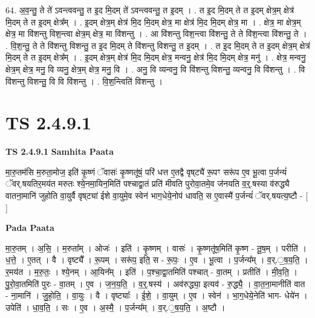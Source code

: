 \documentclass[17pt]{extarticle}
\begin{document}
64. अ॒व॒न्तु॒ ते ते॑ ऽवन्त्ववन्तु॒ त इ॒द मि॒दम् ते॑ ऽवन्त्ववन्तु॒ त इ॒दम् । . त इ॒द मि॒दम् ते त इ॒दम् क्षेत्र॒म् क्षेत्र॑ मि॒दम् ते त इ॒दम् क्षेत्र᳚म् । . इ॒दम् क्षेत्र॒म् क्षेत्र॑ मि॒द मि॒दम् क्षेत्र॒ मा क्षेत्र॑ मि॒द मि॒दम् क्षेत्र॒ मा । . क्षेत्र॒ मा क्षेत्र॒म् क्षेत्र॒ मा वि॑शन्तु विश॒न्त्वा क्षेत्र॒म् क्षेत्र॒ मा वि॑शन्तु । . आ वि॑शन्तु विश॒न्त्वा वि॑शन्तु॒ ते ते वि॑श॒न्त्वा वि॑शन्तु॒ ते । . वि॒श॒न्तु॒ ते ते वि॑शन्तु विशन्तु॒ त इ॒द मि॒दम् ते वि॑शन्तु विशन्तु॒ त इ॒दम् । . त इ॒द मि॒दम् ते त इ॒दम् क्षेत्र॒म् क्षेत्र॑ मि॒दम् ते त इ॒दम् क्षेत्र᳚म् । . इ॒दम् क्षेत्र॒म् क्षेत्र॑ मि॒द मि॒दम् क्षेत्र॒ मन्वनु॒ क्षेत्र॑ मि॒द मि॒दम् क्षेत्र॒ मनु॑ । . क्षेत्र॒ मन्वनु॒ क्षेत्र॒म् क्षेत्र॒ मनु॒ वि व्यनु॒ क्षेत्र॒म् क्षेत्र॒ मनु॒ वि । . अनु॒ वि व्यन्वनु॒ वि वि॑शन्तु विशन्तु॒ व्यन्वनु॒ वि वि॑शन्तु । . वि वि॑शन्तु विशन्तु॒ वि वि वि॑शन्तु । . वि॒श॒न्त्विति॑ विशन्तु । \newline
\pagebreak
{}

\section{ TS 2.4.9.1 }

\textbf{TS 2.4.9.1 } \newline
\textbf{Samhita Paata} \newline

मा॒रु॒तम॑सि म॒रुता॒मोज॒ इति॑ कृ॒ष्णं ॅवासः॑ कृ॒ष्णतू॑षं॒ परि॑ धत्त ए॒तद्वै वृष्‌ट्यै॑ रू॒पꣳ सरू॑प ए॒व भू॒त्वा प॒र्जन्यं॑ ॅवर्.षयतिर॒मय॑त मरुतः श्ये॒नमा॒यिन॒मिति॑ पश्चाद्वा॒तं प्रति॑ मीवति पुरोवा॒तमे॒व ज॑नयति व॒र्॒.षस्या व॑रुद्ध्यै वातना॒मानि॑ जुहोति वा॒युर्वै वृष्‌ट्या॑ ईशे वा॒युमे॒व स्वेन॑ भाग॒धेये॒नोप॑ धावति॒ स ए॒वास्मै॑ प॒र्जन्यं॑ ॅवर्.षयत्य॒ष्टौ - [  ] \newline

\textbf{Pada Paata} \newline

मा॒रु॒तम् । अ॒सि॒ । म॒रुता᳚म् । ओजः॑ । इति॑ । कृ॒ष्णम् । वासः॑ । कृ॒ष्णतू॑ष॒मिति॑ कृ॒ष्ण - तू॒ष॒म् । परीति॑ । ध॒त्ते॒ । ए॒तत् । वै । वृष्ट्यै᳚ । रू॒पम् । सरू॑प॒ इति॒ स - रू॒पः॒ ।  ए॒व । भू॒त्वा । प॒र्जन्य᳚म् । व॒र्.॒ष॒य॒ति॒ । र॒मय॑त । म॒रु॒तः॒ । श्ये॒नम् । आ॒यिन᳚म् । इति॑ । प॒श्चा॒द्वा॒तमिति॑ पश्चात् - वा॒तम् । प्रतीति॑ । मी॒व॒ति॒ । पु॒रो॒वा॒तमिति॑ पुरः - वा॒तम् । ए॒व । ज॒न॒य॒ति॒ । व॒र्॒.षस्य॑ । अव॑रुद्ध्या॒ इत्यव॑ - रु॒द्ध्यै॒ । वा॒त॒ना॒मानीति॑ वात - ना॒मानि॑ । जु॒हो॒ति॒ । वा॒युः । वै । वृष्ट्याः᳚ । ई॒शे॒ ।   वा॒युम् । ए॒व । स्वेन॑ । भा॒ग॒धेये॒नेति॑ भाग- धेये॑न । उपेति॑ । धा॒व॒ति॒ । सः । ए॒व । अ॒स्मै॒ । प॒र्जन्य᳚म् । व॒र्.॒ष॒य॒ति॒ । अ॒ष्टौ ।  \newline
\end{document}
